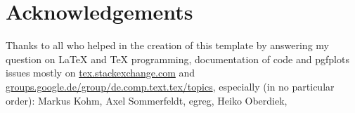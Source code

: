 \section*{Acknowledgements}
Thanks to all who helped in the creation of this template by answering my question on LaTeX and TeX programming, documentation of code and pgfplots issues mostly on \href{http://tex.stackexchange.com}{tex.stackexchange.com} and
\href{de.comp.text.tex}{groups.google.de/group/de.comp.text.tex/topics}, especially (in no particular order): 
Markus Kohm, %
Axel Sommerfeldt, %
egreg, %
Heiko Oberdiek, %

